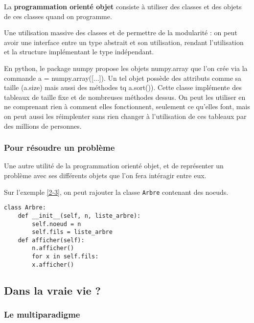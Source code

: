 \begin{definition}
	La \textbf{programmation orienté objet} consiste à utiliser des classes et des objets de ces classes quand on programme.
\end{definition}

\begin{rem}
	Une utilisation massive des classes et de permettre de la modularité : on peut avoir une interface entre un type abstrait et son utilisation, rendant l'utilisation et la structure implémentant le type indépendant.
\end{rem}

\begin{example}
	En python, le package numpy propose les objets numpy.array que l’on crée via la commande
	a = numpy.array([...]). Un tel objet possède des attributs comme sa taille (a.size) mais aussi des
	méthodes tq a.sort()). Cette classe implémente des tableaux de taille fixe et de nombreuses méthodes dessus. On peut les utiliser en ne comprenant rien à comment elles fonctionnent, seulement ce qu'elles font, mais on peut aussi les réimplenter sans rien changer à l'utilisation de ces tableaux par des millions de personnes.
\end{example}

\subsubsection{Pour résoudre un problème}

Une autre utilité de la programmation orienté objet, et de représenter un problème avec ses différents objets que l'on fera intéragir entre eux.

\begin{example}
	Sur l'exemple \ref{2-3}, on peut rajouter la classe \lstinline|Arbre| contenant des noeuds.
	\begin{lstlisting}
class Arbre:
    def __init__(self, n, liste_arbre):
        self.noeud = n
        self.fils = liste_arbre
    def afficher(self):
        n.afficher()
        for x in self.fils:
        x.afficher()
	\end{lstlisting}
\end{example}

\subsection{Dans la vraie vie ?}

\subsubsection{Le multiparadigme}

